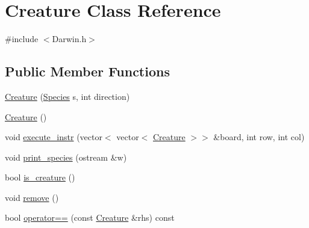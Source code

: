 \hypertarget{classCreature}{\section{Creature Class Reference}
\label{classCreature}
}


{\ttfamily \#include $<$Darwin.\-h$>$}

\subsection*{Public Member Functions}
\begin{DoxyCompactItemize}
\item 
\hyperlink{classCreature_ad0d47f9e99a27af69c446708d21c190a}{Creature} (\hyperlink{classSpecies}{Species} s, int direction)
\item 
\hyperlink{classCreature_a597cc3b08ee17de46c3e7ec3cf0d9b58}{Creature} ()
\item 
void \hyperlink{classCreature_a78970c87f01823e33bbbb3ef3c6262c8}{execute\-\_\-instr} (vector$<$ vector$<$ \hyperlink{classCreature}{Creature} $>$$>$ \&board, int row, int col)
\item 
void \hyperlink{classCreature_a677181a3ef2f4e85d21b36a86ae6fd2f}{print\-\_\-species} (ostream \&w)
\item 
bool \hyperlink{classCreature_ad44d9b96ecb95ee14fea6c71cb9597d7}{is\-\_\-creature} ()
\item 
void \hyperlink{classCreature_aeed948802a3bacc94f572534d0d476b7}{remove} ()
\item 
bool \hyperlink{classCreature_a4641e39d382f02afb77cfe6b57a9e2a2}{operator==} (const \hyperlink{classCreature}{Creature} \&rhs) const 
\end{DoxyCompactItemize}
